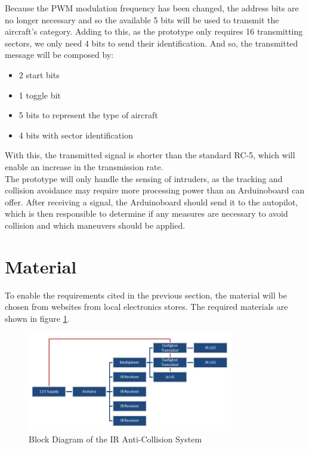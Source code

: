 Because the PWM modulation frequency has been changed, the address bits are no longer necessary and so the available 5 bits will be used to transmit the aircraft's category. Adding to this, as the prototype only requires 16 transmitting sectors, we only need 4 bits to send their identification. And so, the transmitted message will be composed by:
\begin{itemize}
\item 2 start bits
\item 1 toggle bit
\item 5 bits to represent the type of aircraft
\item 4 bits with sector identification
\end{itemize} 
With this, the transmitted signal is shorter than the standard RC-5, which will enable an increase in the transmission rate.\\

The prototype will only handle the sensing of intruders, as the tracking and collision avoidance may require more processing power than an Arduino\texttrademark board can offer. After receiving a signal, the Arduino\texttrademark board should send it to the autopilot, which is then responsible to determine if any measures are necessary to avoid collision and which maneuvers should be applied.\\

\section{Material}
\label{section:material}
To enable the requirements cited in the previous section, the material will be chosen from websites from local electronics stores. The required materials are shown in figure \ref{fig:irblockdiagram}.\\
\begin{figure}[!htb]
  \centering
  \includegraphics[width=0.8\textwidth]{Figures/blocoscompleto.png}
  \caption[Block Diagram of the IR Anti-Collision System]{Block Diagram of the IR Anti-Collision System}
  \label{fig:irblockdiagram}
\end{figure}

